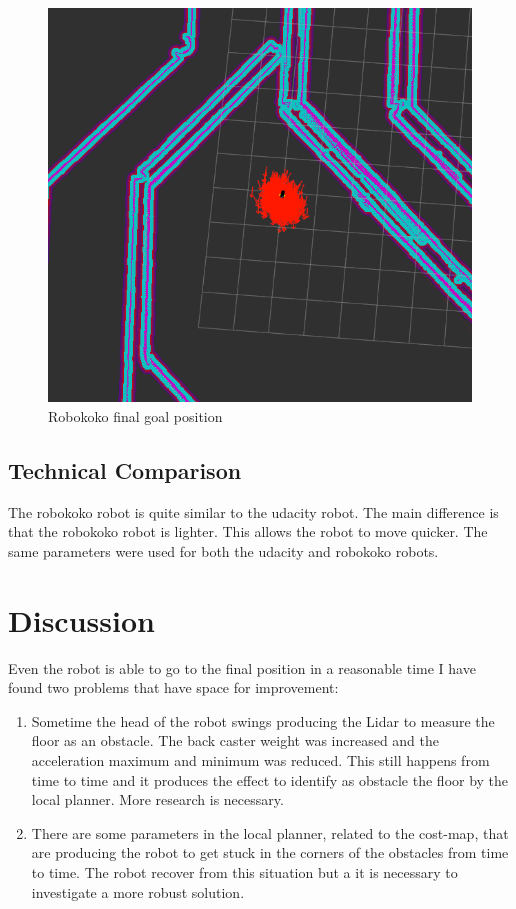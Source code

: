 \documentclass[10pt,journal,compsoc]{IEEEtran}
\begin{document}
\begin{figure}[h]
\centering
\includegraphics[scale=0.3]{rviz-robot-own-goal-position}
\caption{Robokoko final goal position}
\label{fig:mesh4}
\end{figure}

\subsection{Technical Comparison} %

The robokoko robot is quite similar to the udacity robot. The main difference is that the robokoko robot is lighter. This allows the robot to move quicker. The same parameters were used for both the udacity and robokoko robots. 

\section{Discussion}

Even the robot is able to go to the final position in a reasonable time I have found two problems that have space for improvement:

\begin{enumerate}
\item Sometime the head of the robot swings producing the Lidar to measure the floor as an obstacle. The back caster weight was increased and the acceleration maximum and minimum was reduced. This still happens from time to time and it produces the effect to identify as obstacle the floor by the local planner. More research is necessary.
\item There are some parameters in the local planner, related to the cost-map, that are producing the robot to get stuck in the corners of the obstacles from time to time. The robot recover from this situation but a it is necessary to investigate a more robust solution.
\end{enumerate}	
\end{document}
